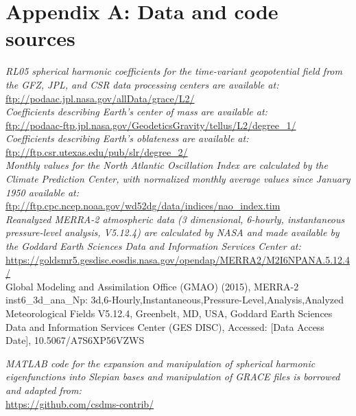 \newpage 
\appendix

\section{Appendix A: Data and code sources \label{app:a}}
\textit{RL05 spherical harmonic coefficients for the time-variant geopotential field from the GFZ, JPL, and CSR data processing centers are available at:} \\
\indent \url{ftp://podaac.jpl.nasa.gov/allData/grace/L2/}\\

\noindent\textit{Coefficients describing Earth's center of mass \cite[spherical harmonic degree~1, from][]{swenson2008} are available at:} \\
\indent\url{ftp://podaac-ftp.jpl.nasa.gov/GeodeticsGravity/tellus/L2/degree_1/}\\

\noindent\textit{Coefficients describing Earth's oblateness \cite[spherical harmonic degree~2, order~0, from][]{cheng2013} are available at:} \\
\indent \url{ftp://ftp.csr.utexas.edu/pub/slr/degree_2/}\\

\noindent\textit{Monthly values for the North Atlantic Oscillation Index are calculated by the Climate Prediction Center, with normalized monthly average values since January 1950 available at:} \\
\indent \url{ftp://ftp.cpc.ncep.noaa.gov/wd52dg/data/indices/nao_index.tim}\\

\noindent\textit{Reanalyzed MERRA-2 atmospheric data (3 dimensional, 6-hourly, instantaneous pressure-level analysis, V5.12.4) are calculated by NASA and made available by the Goddard Earth Sciences Data and Information Services Center at:} \\
\indent \url{https://goldsmr5.gesdisc.eosdis.nasa.gov/opendap/MERRA2/M2I6NPANA.5.12.4/}\\
Global Modeling and Assimilation Office (GMAO) (2015), MERRA-2 inst6\_3d\_ana\_Np: 3d,6-Hourly,Instantaneous,Pressure-Level,Analysis,Analyzed Meteorological Fields V5.12.4, Greenbelt, MD, USA, Goddard Earth Sciences Data and Information Services Center (GES DISC), Accessed: [Data Access Date], 10.5067/A7S6XP56VZWS


\noindent\textit{MATLAB code for the expansion and manipulation of spherical harmonic
eigenfunctions into Slepian bases and manipulation of GRACE files is borrowed and adapted from:} \\
\indent \url{https://github.com/csdms-contrib/}\\

